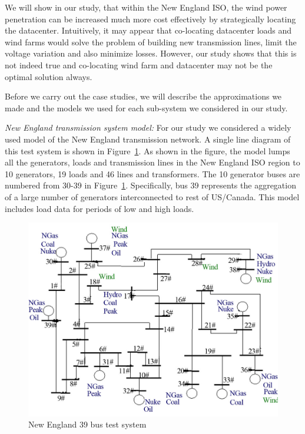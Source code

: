 We will show in our study, that within the New England ISO, the wind power penetration can be increased much more cost effectively by strategically locating the datacenter. Intuitively, it may appear that co-locating datacenter loads and wind farms would solve the problem of building new transmission lines, limit the voltage variation and also minimize losses. However, our study shows that this is not indeed true and co-locating wind farm and datacenter may not be the optimal solution always.

Before we carry out the case studies, we will describe the approximations we made and the models we used for each sub-system we considered in our study.

{\em New England transmission system model:}
For our study we considered a widely used  \cite{bills1970line} model of the New England transmission network. A single line diagram of this test system is shown in Figure~\ref{fig:newengland}. As shown in the figure, the model lumps all the generators, loads and transmission lines in the New England ISO region to 10 generators, 19 loads and 46 lines and transformers. The 10 generator buses are numbered from 30-39 in Figure~\ref{fig:newengland}. Specifically, bus 39 represents the aggregation of a large number of generators interconnected to rest of US/Canada.  This model includes load data for periods of low and high loads.

\begin{figure}[ht]
\centering
\includegraphics[width=1\columnwidth]{img/newEngland.jpg}
\caption{New England 39 bus test system}
\label{fig:newengland}
\end{figure}

